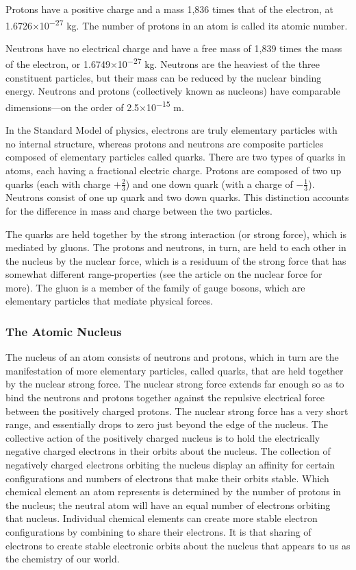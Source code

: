 \documentclass[
]{article}
\begin{document}
Protons have a positive charge and a mass 1,836 times that of the
electron, at 1.6726×10\textsuperscript{−27} kg. The number of protons in
an atom is called its atomic number.

Neutrons have no electrical charge and have a free mass of 1,839 times
the mass of the electron, or 1.6749×10\textsuperscript{−27} kg. Neutrons
are the heaviest of the three constituent particles, but their mass can
be reduced by the nuclear binding energy. Neutrons and protons
(collectively known as nucleons) have comparable dimensions---on the
order of 2.5×10\textsuperscript{−15} m.

In the Standard Model of physics, electrons are truly elementary
particles with no internal structure, whereas protons and neutrons are
composite particles composed of elementary particles called quarks.
There are two types of quarks in atoms, each having a fractional
electric charge. Protons are composed of two up quarks (each with charge
\(+\frac{2}{3}\)) and one down quark (with a charge of
\(−\frac{1}{3}\)). Neutrons consist of one up quark and two down quarks.
This distinction accounts for the difference in mass and charge between
the two particles.

The quarks are held together by the strong interaction (or strong
force), which is mediated by gluons. The protons and neutrons, in turn,
are held to each other in the nucleus by the nuclear force, which is a
residuum of the strong force that has somewhat different
range-properties (see the article on the nuclear force for more). The
gluon is a member of the family of gauge bosons, which are elementary
particles that mediate physical forces.

\hypertarget{the-atomic-nucleus}{%
\subsubsection{The Atomic Nucleus}\label{the-atomic-nucleus}}

The nucleus of an atom consists of neutrons and protons, which in turn
are the manifestation of more elementary particles, called quarks, that
are held together by the nuclear strong force. The nuclear strong force
extends far enough so as to bind the neutrons and protons together
against the repulsive electrical force between the positively charged
protons. The nuclear strong force has a very short range, and
essentially drops to zero just beyond the edge of the nucleus. The
collective action of the positively charged nucleus is to hold the
electrically negative charged electrons in their orbits about the
nucleus. The collection of negatively charged electrons orbiting the
nucleus display an affinity for certain configurations and numbers of
electrons that make their orbits stable. Which chemical element an atom
represents is determined by the number of protons in the nucleus; the
neutral atom will have an equal number of electrons orbiting that
nucleus. Individual chemical elements can create more stable electron
configurations by combining to share their electrons. It is that sharing
of electrons to create stable electronic orbits about the nucleus that
appears to us as the chemistry of our world.
\end{document}
